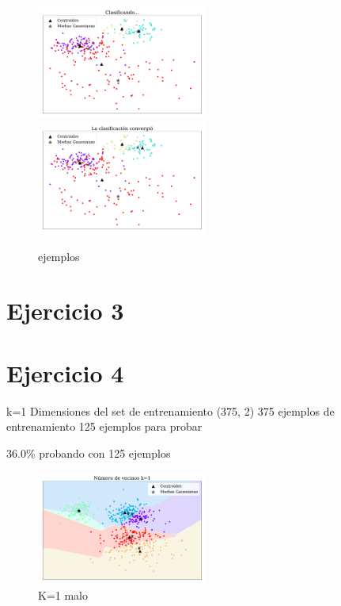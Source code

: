     \begin{figure}[H]
        \centering
        \includegraphics[width=0.5\textwidth]{plots/ejer_2_clasificando.pdf}
        \includegraphics[width=0.5\textwidth]{plots/ejer_2_no_converge.pdf}
        \caption{ejemplos}
        \label{fig:ejer2_no_converge}
    \end{figure}

   \section*{Ejercicio 3}


    \section*{Ejercicio 4}


k=1
Dimensiones del set de entrenamiento  (375, 2)
375 ejemplos de entrenamiento
125 ejemplos para probar

36.0\% probando con 125 ejemplos

\begin{figure}[H]
    \centering
    \includegraphics[width=0.5\textwidth]{plots/ejer_4_K-1_no_coverge.pdf}
    \caption{K=1 malo}
    \label{fig:ejer4_k_1_malo}
\end{figure} 

